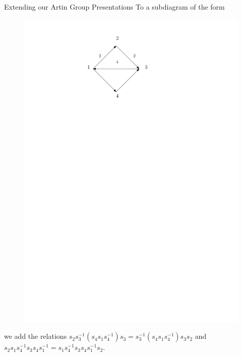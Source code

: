 \documentclass{beamer}
\begin{document}
\begin{frame}{Extending our Artin Group Presentations}
To a subdiagram of the form
\begin{figure}
\includegraphics[scale = .50]{Diagram3.pdf}
\end{figure}
we add the relations $s_{2}s_{3}^{-1}(s_{4}s_{1}s_{4}^{-1})s_{3} = s_{3}^{-1}(s_{4}s_{1}s_{4}^{-1})s_{3}s_{2}$ and \\
$s_{2}s_{1}s_{4}^{-1}s_{3}s_{4}s_{1}^{-1} = s_{1}s_{4}^{-1}s_{3}s_{4}s_{1}^{-1}s_{2}$.
\end{frame}
\end{document}
